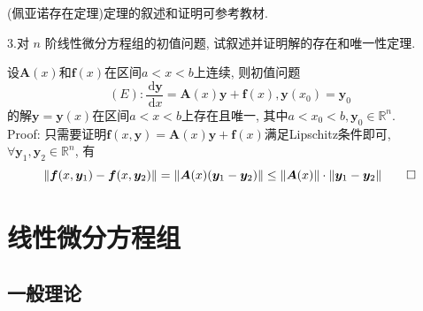 \documentclass[titlepage,11pt,a4paper,twoside]{report}
\makeatletter
\newcommand\diff{\,\mathrm{d}}
\newenvironment{solve}{\par
	\pushQED{\qed}%
	\normalfont \topsep1\p@\@plus6\p@\relax
	\trivlist
	\item\relax
	{\hspace*{\parindent}{\heiti 解}\@addpunct{:}}\hspace\labelsep\ignorespaces
}{%
	\popQED\endtrivlist\@endpefalse
}
\makeatother
\begin{document}
(佩亚诺存在定理)定理的叙述和证明可参考教材.\par 
3.对 $n$ 阶线性微分方程组的初值问题, 试叙述并证明解的存在和唯一性定理.
\begin{solve} 设$\bm{A}(x)$和$\bm{f}(x)$在区间$a<x<b$上连续, 则初值问题
\[(E):\frac{\diff\bm{y}}{\diff x}=\bm{A}(x)\bm{y}+\bm{f}(x),\bm{y}(x_0)=\bm{y}_0\]
的解$\bm{y}=\bm{y}(x)$在区间$a<x<b$上存在且唯一, 其中$a<x_0<b,\bm{y}_0\in\mathbb{R}^n$.\\
Proof: 只需要证明$\bm{f}(x,\bm{y})=\bm{A}(x)\bm{y}+\bm{f}(x)$满足Lipschitz条件即可, $\forall\bm{y}_1,\bm{y}_2\in\mathbb{R}^n$, 有
\[\|\bm{f}(x,\bm{y}_1)-\bm{f}(x,\bm{y}_2)\|=\|\bm{A}(x)(\bm{y}_1-\bm{y}_2)\|\leq\|\bm{A}(x)\|\cdot\|\bm{y}_1-\bm{y}_2\|\qedhere\]
\end{solve}
\chapter{线性微分方程组}
\section{一般理论}
\end{document}
